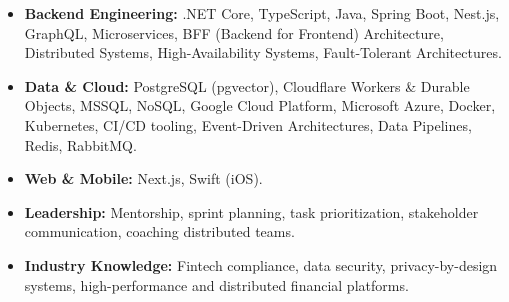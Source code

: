 \begin{itemize}
  \item \textbf{Backend Engineering:} .NET Core, TypeScript, Java, Spring Boot, Nest.js, GraphQL, Microservices, BFF (Backend for Frontend) Architecture, Distributed Systems, High-Availability Systems, Fault-Tolerant Architectures.
  \item \textbf{Data \& Cloud:} PostgreSQL (pgvector), Cloudflare Workers \& Durable Objects, MSSQL, NoSQL, Google Cloud Platform, Microsoft Azure, Docker, Kubernetes, CI/CD tooling, Event-Driven Architectures, Data Pipelines, Redis, RabbitMQ.
  \item \textbf{Web \& Mobile:} Next.js, Swift (iOS).
  \item \textbf{Leadership:} Mentorship, sprint planning, task prioritization, stakeholder communication, coaching distributed teams.
  \item \textbf{Industry Knowledge:} Fintech compliance, data security, privacy-by-design systems, high-performance and distributed financial platforms.
\end{itemize}

